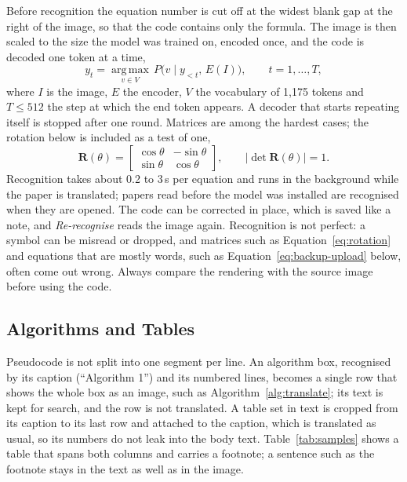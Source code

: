 \documentclass[11pt]{article}
\begin{document}
Before recognition the equation number is cut off at the widest blank gap at the right of the image, so that the code contains only the formula. The image is then scaled to the size the model was trained on, encoded once, and the code is decoded one token at a time,
\begin{equation}
  y_t = \operatorname*{arg\,max}_{v \in V} \, P\bigl(v \mid y_{<t},\, E(I)\bigr), \qquad t = 1, \dots, T,
  \label{eq:decode}
\end{equation}
where $I$ is the image, $E$ the encoder, $V$ the vocabulary of 1{,}175 tokens and $T \le 512$ the step at which the end token appears. A decoder that starts repeating itself is stopped after one round. Matrices are among the hardest cases; the rotation below is included as a test of one,
\begin{equation}
  \mathbf{R}(\theta) =
  \begin{bmatrix}
    \cos\theta & -\sin\theta \\
    \sin\theta & \cos\theta
  \end{bmatrix},
  \qquad \lvert \det \mathbf{R}(\theta) \rvert = 1 .
  \label{eq:rotation}
\end{equation}
Recognition takes about 0.2 to 3\,s per equation and runs in the background while the paper is translated; papers read before the model was installed are recognised when they are opened. The code can be corrected in place, which is saved like a note, and \emph{Re-recognise} reads the image again. Recognition is not perfect: a symbol can be misread or dropped, and matrices such as Equation~\eqref{eq:rotation} and equations that are mostly words, such as Equation~\eqref{eq:backup-upload} below, often come out wrong. Always compare the rendering with the source image before using the code.

\subsection{Algorithms and Tables}
\label{sec:blocks}
Pseudocode is not split into one segment per line. An algorithm box, recognised by its caption (``Algorithm 1'') and its numbered lines, becomes a single row that shows the whole box as an image, such as Algorithm~\ref{alg:translate}; its text is kept for search, and the row is not translated. A table set in text is cropped from its caption to its last row and attached to the caption, which is translated as usual, so its numbers do not leak into the body text. Table~\ref{tab:samples} shows a table that spans both columns and carries a footnote; a sentence such as the footnote stays in the text as well as in the image.
\end{document}
